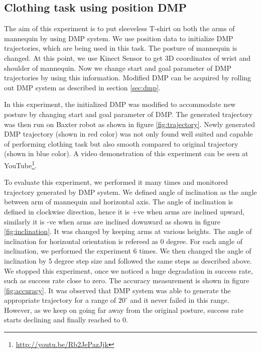 \documentclass[sigconf]{acmart}
\begin{document}
\subsection{Clothing task using position DMP}
The aim of this experiment is to put sleeveless T-shirt on both the arms of mannequin by using DMP system. We use position data to initialize DMP trajectories, which are being used in this task. The posture of mannequin is changed. At this point, we use Kinect Sensor to get 3D coordinates of wrist and shoulder of mannequin. Now we change start and goal parameter of DMP trajectories by using this information. Modified DMP can be acquired by rolling out DMP system as described in section \ref{sec:dmp}.

In this experiment, the initialized DMP was modified to accommodate new posture by changing start and goal parameter of DMP. The generated trajectory was then run on Baxter robot as shown in figure \ref{fig:trajectory}. Newly generated DMP trajectory (shown in red color) was not only found well suited and capable of performing clothing task but also smooth compared to original trajectory (shown in blue color). A video demonstration of this experiment can be seen at YouTube\footnote{\url{http://youtu.be/Rb2JePazJjk}}.

To evaluate this experiment, we performed it many times and monitored trajectory generated by DMP system. We defined angle of inclination as the angle between arm of mannequin and horizontal axis. The angle of inclination is defined in clockwise direction, hence it is +ve when arms are inclined upward, similarly it is -ve when arms are inclined downward as shown in figure \ref{fig:inclination}. It was changed by keeping arms at various heights. The angle of inclination for horizontal  orientation is refereed as 0 degree. For each angle of inclination, we performed the experiment 6 times. We then changed the angle of inclination by 5 degree step size and followed the same steps as described above. We stopped this experiment, once we noticed a huge degradation in success rate, such as success rate close to zero. The accuracy measurement is shown in figure \ref{fig:accuracy}. It was observed that DMP system was able to generate the appropriate trajectory for a range of $20^\circ$ and it never failed in this range. However, as we keep on going far away from the original posture, success rate starts declining and finally reached to $0$. 
\end{document}

